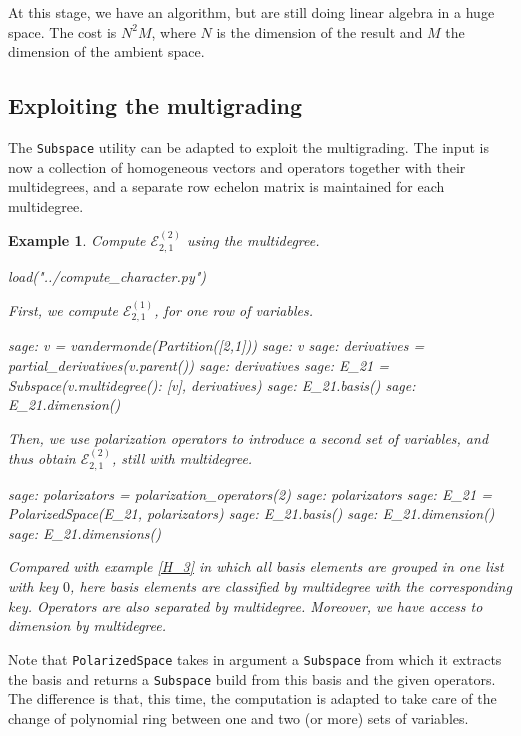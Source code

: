 \documentclass[letter,12pt]{article}
\newtheorem{example}{Example}
\begin{document}
	At this stage, we have an algorithm, but are still doing linear algebra in a huge space. The cost is $N^2 M$, where $N$ is the dimension of the result and $M$ the dimension of the ambient space.
	
	\subsection{Exploiting the multigrading}
	
	The \texttt{Subspace} utility can be adapted to exploit the multigrading. The input is now a collection of homogeneous vectors and operators together with their multidegrees, and a separate row echelon matrix is maintained for each multidegree.
	
	\begin{example} Compute $\mathcal{E}_{2,1}^{(2)}$ using the multidegree. 
		\begin{sagesilent}
			load("../compute_character.py")
		\end{sagesilent}
		First, we compute $\mathcal{E}_{2,1}^{(1)}$, for one row of variables. 
		\begin{sagecommandline}
			sage: v = vandermonde(Partition([2,1]))
			sage: v
			sage: derivatives = partial_derivatives(v.parent())
			sage: derivatives
			sage: E_21 = Subspace({v.multidegree(): [v]}, derivatives)
			sage: E_21.basis()
			sage: E_21.dimension()
		\end{sagecommandline}
		Then, we use polarization operators to introduce a second set of variables, and thus obtain $\mathcal{E}_{2,1}^{(2)}$, still with multidegree. 
		\begin{sagecommandline}
			sage: polarizators = polarization_operators(2)
			sage: polarizators
			sage: E_21 = PolarizedSpace(E_21, polarizators)
			sage: E_21.basis()
			sage: E_21.dimension()
			sage: E_21.dimensions()
		\end{sagecommandline}
		Compared with example \ref{H_3} in which all basis elements are grouped in one list with key $0$, here basis elements are classified by multidegree with the corresponding key. Operators are also separated by multidegree. Moreover, we have access to dimension by multidegree. 
	\end{example}
	
	Note that \texttt{PolarizedSpace} takes in argument a \texttt{Subspace} from which it extracts the basis and returns a \texttt{Subspace} build from this basis and the given operators. The difference is that, this time, the computation is adapted to take care of the change of polynomial ring between one and two (or more) sets of variables. \\
	
\end{document}
